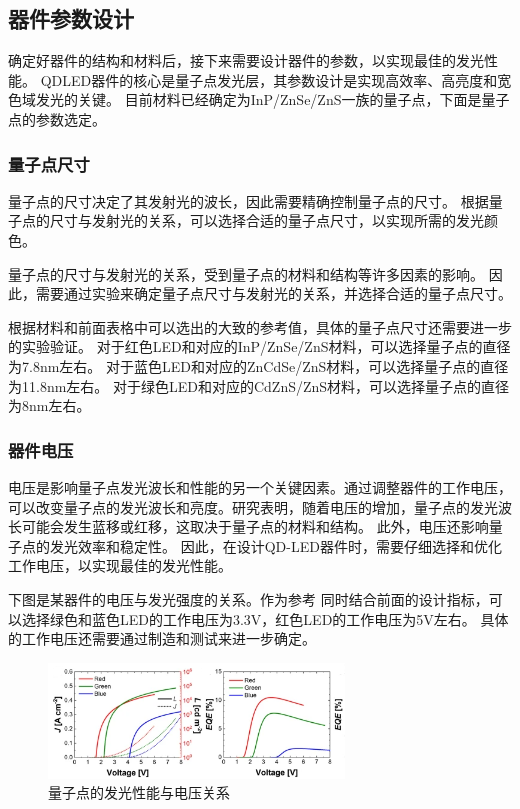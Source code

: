 \documentclass[12pt,hyperref,a4paper,UTF8]{ctexart}
\begin{document}
\subsection{器件参数设计}

确定好器件的结构和材料后，接下来需要设计器件的参数，以实现最佳的发光性能。
QDLED器件的核心是量子点发光层，其参数设计是实现高效率、高亮度和宽色域发光的关键。
目前材料已经确定为InP/ZnSe/ZnS一族的量子点，下面是量子点的参数选定。

\subsubsection*{量子点尺寸}
量子点的尺寸决定了其发射光的波长，因此需要精确控制量子点的尺寸。
根据量子点的尺寸与发射光的关系，可以选择合适的量子点尺寸，以实现所需的发光颜色。

量子点的尺寸与发射光的关系，受到量子点的材料和结构等许多因素的影响。
因此，需要通过实验来确定量子点尺寸与发射光的关系，并选择合适的量子点尺寸。

根据材料和前面表格中可以选出的大致的参考值，具体的量子点尺寸还需要进一步的实验验证。
对于红色LED和对应的InP/ZnSe/ZnS材料，可以选择量子点的直径为7.8nm左右。
对于蓝色LED和对应的ZnCdSe/ZnS材料，可以选择量子点的直径为11.8nm左右。
对于绿色LED和对应的CdZnS/ZnS材料，可以选择量子点的直径为8nm左右。

\subsubsection*{器件电压}

电压是影响量子点发光波长和性能的另一个关键因素。通过调整器件的工作电压，可以改变量子点的发光波长和亮度。研究表明，随着电压的增加，量子点的发光波长可能会发生蓝移或红移，这取决于量子点的材料和结构。
此外，电压还影响量子点的发光效率和稳定性。
因此，在设计QD-LED器件时，需要仔细选择和优化工作电压，以实现最佳的发光性能。

下图是某器件的电压与发光强度的关系\cite{jung2021modelling}。作为参考
同时结合前面的设计指标，可以选择绿色和蓝色LED的工作电压为3.3V，红色LED的工作电压为5V左右。
具体的工作电压还需要通过制造和测试来进一步确定。


\begin{figure}[H]
  \centering
  \includegraphics[width=0.7\textwidth]{figures/fig/image11.png} 
  \caption{量子点的发光性能与电压关系\cite{jung2021modelling}}
\end{figure}
\end{document}
